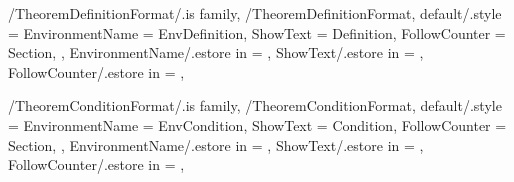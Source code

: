 \newcommand{\InsertTheorem}[2][\empty]
{%
  \InsertTheoremContent[#1]{\GetTheoremTheoremFormatEnvironmentName}{#2}%
} %

\newcommand{\InitTheoremTheoremFormat}
{%
  \theoremstyle{plain}%
  \ifthenelse{\equal{\GetTheoremTheoremFormatFollowCounter}{\empty}}%
  {%
    \newtheorem{%
      \GetTheoremTheoremFormatEnvironmentName}{%
      \GetTheoremTheoremFormatShowText}%
  }%
  {%
    \MappingTheoremCounter[Theorem]{\GetTheoremTheoremFormatFollowCounter}%
    \newtheorem{%
      \GetTheoremTheoremFormatEnvironmentName}{%
      \GetTheoremTheoremFormatShowText}[section]%
  }%
} %


\pgfkeys
{
  /TheoremDefinitionFormat/.is family, /TheoremDefinitionFormat,
  default/.style =
  {
    EnvironmentName = {EnvDefinition},
    ShowText = {Definition},
    FollowCounter = Section,
  },
  EnvironmentName/.estore in = \GetTheoremDefinitionFormatEnvironmentName,
  ShowText/.estore in = \GetTheoremDefinitionFormatShowText,
  FollowCounter/.estore in = \GetTheoremDefinitionFormatFollowCounter,
} %

\newcommand{\InsertDefinition}[2][\empty]
{%
  \InsertTheoremContent[#1]{\GetTheoremDefinitionFormatEnvironmentName}{#2}%
} %

\newcommand{\InitTheoremDefinitionFormat}
{%
  \theoremstyle{definition}%
  \ifthenelse{\equal{\GetTheoremDefinitionFormatFollowCounter}{\empty}}%
  {%
    \newtheorem{%
      \GetTheoremDefinitionFormatEnvironmentName}{%
      \GetTheoremDefinitionFormatShowText}%
  }%
  {%
    \MappingTheoremCounter[Definition]{\GetTheoremDefinitionFormatFollowCounter}%
    \newtheorem{%
      \GetTheoremDefinitionFormatEnvironmentName}{%
      \GetTheoremDefinitionFormatShowText}[%
      \GetTheoremDefinitionFormatFollowCounter]%
  }%
} %


\pgfkeys
{
  /TheoremConditionFormat/.is family, /TheoremConditionFormat,
  default/.style =
  {
    EnvironmentName = {EnvCondition},
    ShowText = {Condition},
    FollowCounter = Section,
  },
  EnvironmentName/.estore in = \GetTheoremConditionFormatEnvironmentName,
  ShowText/.estore in = \GetTheoremConditionFormatShowText,
  FollowCounter/.estore in = \GetTheoremConditionFormatFollowCounter,
} %

